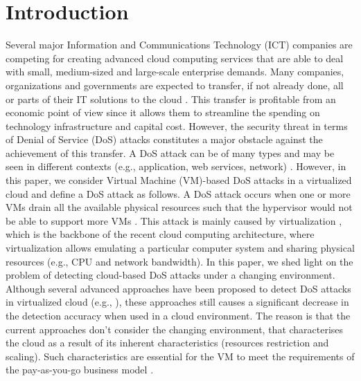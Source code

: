 \documentclass[twocolumn]{bmcart}%
\begin{document}
\section*{Introduction}
Several major Information and Communications Technology (ICT) companies are competing for creating advanced cloud computing services that are able to deal with small, medium-sized and large-scale enterprise demands. Many companies, organizations and governments are expected to transfer, if not already done, all or parts of their IT solutions to the cloud \cite{Wong:2016} \cite{gonzales2015cloud}. This transfer is profitable from an economic point of view since it allows them to streamline the spending on technology infrastructure and capital cost. However, the security threat in terms of Denial of Service (DoS) attacks constitutes a major obstacle against the achievement of this transfer. A DoS attack can be of many types and may be seen in different contexts (e.g., application, web services, network) \cite{modi2013survey}. However, in this paper, we consider Virtual Machine (VM)-based DoS attacks in a virtualized cloud and define a DoS attack as follows. A DoS attack occurs when one or more VMs drain all the available physical resources such that the hypervisor would not be able to support more VMs \cite{tsai2012threat}. This attack is mainly caused by virtualization \cite{shea2012understanding} \cite{tsai2012threat}, which is the backbone of the recent cloud computing architecture, where virtualization allows emulating a particular computer system and sharing physical resources (e.g., CPU and network bandwidth).
In this paper, we shed light on the problem of detecting cloud-based DoS attacks under a changing environment. Although several advanced approaches have been proposed to detect DoS attacks in virtualized cloud (e.g., \cite{gupta2013vm} \cite{masood2013edos} \cite{koduru2013detection} \cite{kwon2011self}), these approaches still causes a significant decrease in the detection accuracy when used in a cloud environment. The reason is that the current approaches don't consider the changing environment, that characterises the cloud as a result of its inherent characteristics (resources restriction and scaling). Such characteristics are essential for the VM to meet the requirements of the pay-as-you-go business model \cite{wahab2017optimal}.
\end{document}
